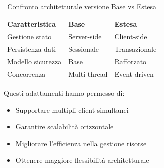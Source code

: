 \begin{table}[h]
    \centering
    \caption{Confronto architetturale versione Base vs Estesa}
    \begin{tabular}{|l|l|l|}
        \hline
        \textbf{Caratteristica} & \textbf{Base} & \textbf{Estesa} \\
        \hline
        Gestione stato & Server-side & Client-side \\
        \hline
        Persistenza dati & Sessionale & Transazionale \\
        \hline
        Modello sicurezza & Base & Rafforzato \\
        \hline
        Concorrenza & Multi-thread & Event-driven \\
        \hline
    \end{tabular}
\end{table}

Questi adattamenti hanno permesso di:
\begin{itemize}
    \item Supportare multipli client simultanei
    \item Garantire scalabilità orizzontale
    \item Migliorare l'efficienza nella gestione risorse
    \item Ottenere maggiore flessibilità architetturale
\end{itemize}